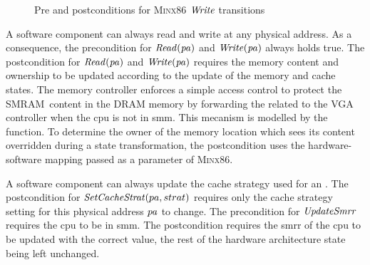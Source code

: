 \begin{figure}[p]
{    \begin{prooftree}
    \end{prooftree}
  }

  \caption{Pre and postconditions for {\scshape Minx86} \( \func{Write} \)
    transitions}
  \label{fig:speccert2:softprepost}
\end{figure}

A software component can always read and write at any physical address.
%
%
As a consequence, the precondition for \( \func{Read}(\var{pa}) \) and
\( \func{Write}(\var{pa}) \) always holds true.
%
The postcondition for \( \func{Read}(\var{pa}) \) and
\( \func{Write}(\var{pa}) \) requires the memory content and ownership to be
updated according to the update of the memory and cache states.
%
%
The memory controller enforces a simple access control to protect the
SMRAM content in the DRAM memory by forwarding the related \IO to the VGA
controller when the \ac{cpu} is not in \ac{smm}.
%
This mecanism is modelled by the  function.
%
To determine the owner of the memory location which sees its content overridden
during a state transformation, the postcondition uses the hardware-software
mapping passed as a parameter of {\scshape Minx86}.
%

A software component can always update the cache strategy used for an \IO.
%
The postcondition for \( \func{SetCacheStrat}(pa,strat) \) requires only the
cache strategy setting for this physical address $\var{pa}$ to change.
%
The precondition for \( \func{UpdateSmrr} \) requires the \ac{cpu} to be in
\ac{smm}.
%
The postcondition requires the \ac{smrr} of the \ac{cpu} to be updated with the
correct value, the rest of the hardware architecture state being left unchanged.

